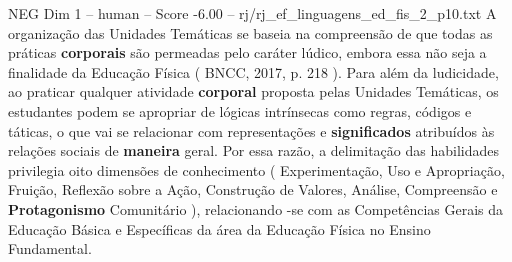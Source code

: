 \begin{textsample}{NEG Dim 1 – human – Score -6.00 – rj/rj\_ef\_linguagens\_ed\_fis\_2\_p10.txt}  \label{ex:f1_neg_009}
A organização das Unidades Temáticas se baseia na compreensão de que todas as práticas \textbf{corporais} são permeadas pelo caráter lúdico, embora essa não seja a finalidade da Educação Física ( BNCC, 2017, p. 218 ).
Para além da ludicidade, ao praticar qualquer atividade \textbf{corporal} proposta pelas Unidades Temáticas, os estudantes podem se apropriar de lógicas intrínsecas como regras, códigos e táticas, o que vai se relacionar com representações e \textbf{significados} atribuídos às relações sociais de \textbf{maneira} geral.
Por essa razão, a delimitação das habilidades privilegia oito dimensões de conhecimento ( Experimentação, Uso e Apropriação, Fruição, Reflexão sobre a Ação, Construção de Valores, Análise, Compreensão e \textbf{Protagonismo} Comunitário ), relacionando -se com as Competências Gerais da Educação Básica e Específicas da área da Educação Física no Ensino Fundamental.

\end{textsample}
